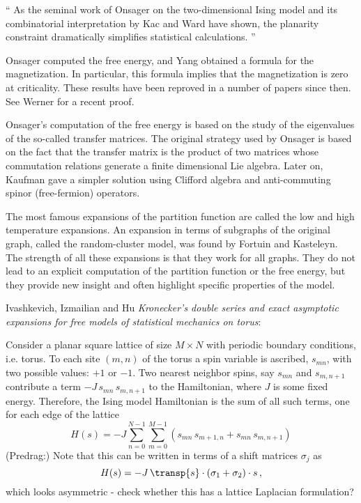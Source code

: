 \begin{description}
{``
As the seminal work of Onsager on the two-dimensional Ising
model and its combinatorial interpretation by Kac and Ward
have shown, the planarity constraint dramatically simplifies statistical
calculations.
''

Onsager computed the free energy, and Yang
obtained a formula for the magnetization.  In particular, this formula
implies that the magnetization is zero at criticality. These results have
been reproved in a number of papers since then. See Werner
for a recent proof.

Onsager's computation of the free energy is based on the study of the
eigenvalues of the so-called transfer matrices. The original strategy
used by Onsager is based on the fact that the transfer matrix is the
product of two matrices whose commutation relations generate a finite
dimensional Lie algebra. Later on, Kaufman gave a simpler
solution using Clifford algebra and anti-commuting spinor (free-fermion)
operators.

The most famous expansions of the partition function are called the low
and high temperature expansions. An expansion in terms of subgraphs of
the original graph, called the random-cluster model, was found by Fortuin
and Kasteleyn. The strength of all these expansions is that
they work for all graphs. They do not lead to an explicit computation of
the partition function or the free energy, but they provide new insight
and often highlight specific properties of the model.
    }

\item[2019-11-04 Predrag]
Ivashkevich, Izmailian and Hu {\em Kronecker's double series
and exact asymptotic expansions for free models of statistical mechanics
on torus}:

Consider a
planar square lattice of size $M\times N$ with periodic boundary
conditions, i.e. torus. To each site $(m,n)$ of the torus a spin
variable is ascribed, $s_{mn}$, with two possible values: $+1$
or $-1$. Two nearest neighbor spins, say $s_{mn}$ and
$s_{m,n+1}$ contribute a term $-J\,s_{mn}\,s_{m,n+1}$ to the
Hamiltonian, where $J$ is some fixed energy. Therefore, the
Ising model
Hamiltonian is the sum of all such terms, one for each edge
of the lattice
\begin{equation}
H(s)=-J\sum_{n=0}^{N-1}\sum_{m=0}^{M-1}
\left(s_{mn}\,s_{m+1,n}+s_{mn}\,s_{m,n+1}\right)
\label{IsingHamiltonian}
\end{equation}
(Predrag:) Note that this can be written in terms of a shift matrices
$\sigma_j$ as
\[
H(s)= %
      -J\,\transp{s}\cdot(\sigma_1+\sigma_2)\cdot{s}
\,,
\]
which looks asymmetric - check whether this has a lattice
Laplacian formulation?


\end{description}
